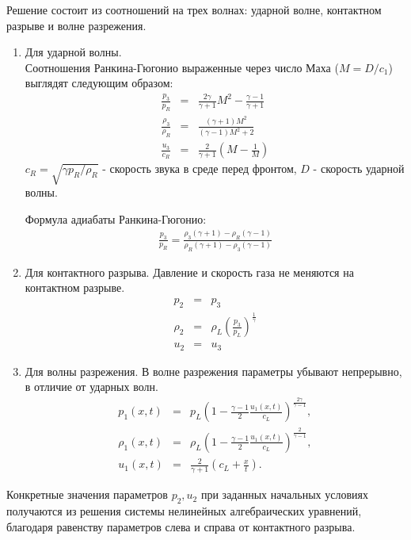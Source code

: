 \documentclass[a4paper,12pt]{extarticle}
\begin{document}
Решение состоит из соотношений на трех волнах: ударной волне, контактном разрыве и волне разрежения. 
\begin{enumerate}
    \item Для ударной волны. \\
    Соотношения Ранкина-Гюгонио выраженные через число Маха ($M= D/c_1$) выглядят следующим образом:
    \begin{eqnarray}
        \frac{p_3}{p_R} & = & \frac{2\gamma}{\gamma+1}M^2-\frac{\gamma-1}{\gamma+1} \\
        \frac{\rho_3}{\rho_R} & = & \frac{(\gamma+1)M^2}{(\gamma-1)M^2+2} \\
        \frac{u_3}{c_R} & = & \frac{2}{\gamma+1}(M-\frac{1}{M})
    \end{eqnarray} 
    $c_R = \sqrt{\gamma p_R / \rho_R}$  - скорость звука в среде перед фронтом, $D$ - скорость ударной волны.
    
    Формула адиабаты Ранкина-Гюгонио:
    \begin{align}
        \frac{p_3}{p_R}=\frac{\rho_3(\gamma+1)-\rho_R(\gamma-1)}{\rho_R(\gamma+1)-\rho_3(\gamma-1)}
    \end{align}

    \item Для контактного разрыва.
    Давление и скорость газа не меняются на контактном разрыве. 
    \begin{eqnarray}
        p_2 &=& p_3\\
        \rho_2 &=& \rho_L \left( \frac{p_3}{p_L} \right)^\frac{1}{\gamma}\\
        u_2 &=& u_3
    \end{eqnarray} 
    \item Для волны разрежения.
    В волне разрежения параметры убывают непрерывно, в отличие от ударных волн.
    \begin{eqnarray}
        p_1(x,t)&=&p_L \left( 1-\frac{\gamma-1}{2}\frac{u_1(x,t)}{c_L} \right)^\frac{2\gamma}{\gamma-1},\\
        \rho_1(x,t)&=&\rho_L \left( 1-\frac{\gamma-1}{2}\frac{u_1(x,t)}{c_L} \right)^\frac{2}{\gamma-1},\\
        u_1(x,t) &=& \frac{2}{\gamma+1}(c_L + \frac{x}{t}).
    \end{eqnarray} 
\end{enumerate}

\indent Конкретные значения параметров $p_2,u_2$ при заданных начальных условиях получаются из решения системы нелинейных алгебраических уравнений, благодаря равенству параметров слева и справа от контактного разрыва.
\end{document}
